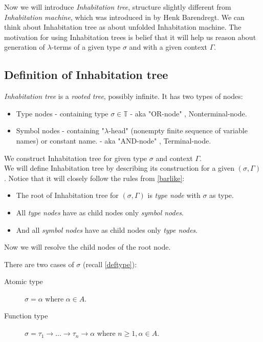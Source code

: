 \documentclass[12pt,a4paper]{report}
\newcommand{\lterms}{$\lambda$-terms\xspace}
\begin{document}
Now we will introduce \textit{Inhabitation tree}, structure slightly different from
\textit{Inhabitation machine}, which was introduced in \cite{barendregt10} by Henk Barendregt.
We can think about Inhabitation tree as about unfolded Inhabitation machine.
The motivation for using Inhabitation trees is belief that it will help us 
reason about generation of \lterms 
of a given type $\sigma$ and with a given context $\Gamma$.  

\subsection{Definition of Inhabitation tree}

\textit{Inhabitation tree} is a \textit{rooted tree}, possibly infinite. 
It has two types of nodes:

\begin{samepage}
\begin{itemize}
  \item Type nodes   
  			- containing type $\sigma \in \mathbb{T}$ 
  			- aka "OR-node" , Nonterminal-node. 
  \item Symbol nodes 
  			- containing "$\lambda$-head" (nonempty finite sequence of variable names) or constant
  			  name. 
  			- aka "AND-node" , Terminal-node.
\end{itemize}
\end{samepage}

We construct Inhabitation tree for given type $\sigma$ and context $\Gamma$.\\
We will define Inhabitation tree by describing its construction for a given $(\sigma,\Gamma)$.
Notice that it will closely follow the rules from \ref{barlike}:

\begin{itemize}
\item The root of Inhabitation tree for $(\sigma,\Gamma)$ is 
      \textit{type node} with $\sigma$ as type.
\item All \textit{type nodes} have as child nodes only \textit{symbol nodes}. 
\item And all \textit{symbol nodes} have as child nodes only \textit{type nodes}. 
\end{itemize}

Now we will resolve the child nodes of the root node.

There are two cases of $\sigma$ (recall \ref{deftype}): 
\begin{description}
	\item[Atomic type] 
		$\sigma = \alpha $ where $\alpha \in A$. 
	\item[Function type] 
		$\sigma = \tau_1 \rightarrow \dots \rightarrow \tau_n \rightarrow \alpha$
		where $n \geq 1, \alpha \in A$.
\end{description}
\end{document}
